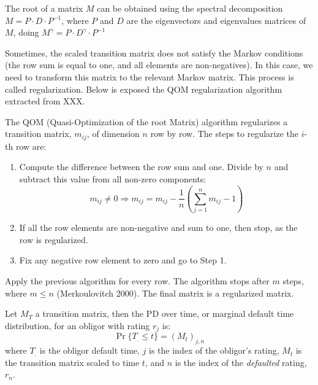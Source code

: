\documentclass[11pt,fleqn]{book} %
\begin{document}
The root of a matrix $M$ can be obtained using the spectral decomposition
$M = P \cdot D \cdot P^{-1}$, where $P$ and $D$ are the eigenvectors and
eigenvalues matrices of $M$, doing $M^{\gamma} = P \cdot D^{\gamma} \cdot P^{-1}$

Sometimes, the scaled transition matrix does not satisfy the Markov conditions
(the row sum is equal to one, and all elements are non-negatives). In this case, 
we need to transform this matrix to the relevant Markov matrix. This process is 
called regularization. Below is exposed the QOM regularization algorithm 
extracted from XXX.

\begin{algorithm}
	The QOM (Quasi-Optimization of the root Matrix) algorithm regularizes a 
	transition matrix, $m_{ij}$, of dimension $n$ row by row. The steps to 
	regularize the $i$-th row are:
	\begin{enumerate}
		\item Compute the difference between the row sum and one. 
		Divide by $n$ and subtract this value from all non-zero components:
		\begin{displaymath}
			m_{ij} \ne 0 
			\Longrightarrow 
			m_{ij} = m_{ij} - \frac{1}{n} \left( \sum_{j=1}^{n} m_{ij} - 1\right)
		\end{displaymath}
		\item If all the row elements are non-negative and sum to one, 
		then stop, as the row is regularized.
		\item Fix any negative row element to zero and go to Step 1.
	\end{enumerate}
	
	Apply the previous algorithm for every row. The algorithm stops after $m$ 
	steps, where $m \le n$ (Merkoulovitch 2000). The final matrix is a regularized
	matrix. 
\end{algorithm}


\begin{proposition}
	Let $M_T$ a transition matrix, then the PD over time, or marginal default
	time distribution, for an obligor with rating $r_j$ is:
	\begin{displaymath}
		\Pr\{T_. \le t\} = \left( M_t \right)_{j, n}
	\end{displaymath}
	where $T_.$ is the obligor default time, $j$ is the index of the obligor's
	rating, $M_t$ is the transition matrix scaled to time $t$, and $n$ is the 
	index of the \emph{defaulted} rating, $r_n$.
\end{proposition}
\end{document}
